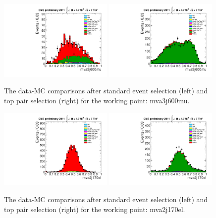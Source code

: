 \begin{figure}[!t]
  \centering
  \includegraphics[width=0.49\textwidth]{figs/cl-mva3j600mu-normal.pdf}
  \includegraphics[width=0.49\textwidth]{figs/cl-mva3j600mu-inTTbar.pdf}
  \caption{\label{fig:mva:plots-mva3j600mu} The data-MC comparisons
    after standard event selection (left) and top pair
    selection (right) for the working point: mva3j600mu.}
\end{figure}

\clearpage
\begin{figure}[!t]
  \centering
  \includegraphics[width=0.49\textwidth]{figs/cl-mva2j170el-normal.pdf}
  \includegraphics[width=0.49\textwidth]{figs/cl-mva2j170el-inTTbar.pdf}
  \caption{\label{fig:mva:plots-mva2j170el} The data-MC comparisons
    after standard event selection (left) and top pair
    selection (right) for the working point: mva2j170el.}
\end{figure}

